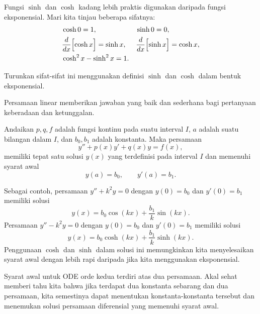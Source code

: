 Fungsi $\sinh$ dan $\cosh$ kadang lebih praktis digunakan daripada fungsi eksponensial. Mari kita tinjau beberapa sifatnya:
\begin{align*}
& \cosh 0  = 1 , &   & \sinh 0 = 0 , \\
& \frac{d}{dx} \Bigl[ \cosh x \Bigr] = \sinh x , &  & \frac{d}{dx} \Bigl[ \sinh x \Bigr] = \cosh x , \\
& \cosh^2 x - \sinh^2 x = 1 .
\end{align*}

\begin{exercise}
Turunkan sifat-sifat ini menggunakan definisi $\sinh$ dan $\cosh$ dalam bentuk eksponensial.
\end{exercise}

Persamaan linear memberikan jawaban yang baik dan sederhana bagi pertanyaan keberadaan dan ketunggalan.

\begin{theorem}
Andaikan $p, q, f$ adalah fungsi kontinu pada suatu interval $I$, $a$ adalah suatu bilangan dalam $I$, dan $b_0, b_1$ adalah konstanta. Maka persamaan
\begin{equation*}
y'' + p(x) y' + q(x) y = f(x) ,
\end{equation*}
memiliki tepat satu solusi $y(x)$ yang terdefinisi pada interval $I$ dan memenuhi syarat awal
\begin{equation*}
y(a) = b_0 , \qquad y'(a) = b_1 .
\end{equation*}
\end{theorem}

Sebagai contoh, persamaan $y'' + k^2 y = 0$ dengan $y(0) = b_0$ dan $y'(0) = b_1$ memiliki solusi
\begin{equation*}
y(x) = b_0 \cos (kx) + \frac{b_1}{k} \sin (kx) .
\end{equation*}
Persamaan $y'' - k^2 y = 0$ dengan $y(0) = b_0$ dan $y'(0) = b_1$ memiliki solusi
\begin{equation*}
y(x) = b_0 \cosh (kx) + \frac{b_1}{k} \sinh (kx) .
\end{equation*}
Penggunaan $\cosh$ dan $\sinh$ dalam solusi ini memungkinkan kita menyelesaikan syarat awal dengan lebih rapi daripada jika kita menggunakan eksponensial.

\medskip

Syarat awal untuk ODE orde kedua terdiri atas dua persamaan. Akal sehat memberi tahu kita bahwa jika terdapat dua konstanta sebarang dan dua persamaan, kita semestinya dapat menentukan konstanta-konstanta tersebut dan menemukan solusi persamaan diferensial yang memenuhi syarat awal.

